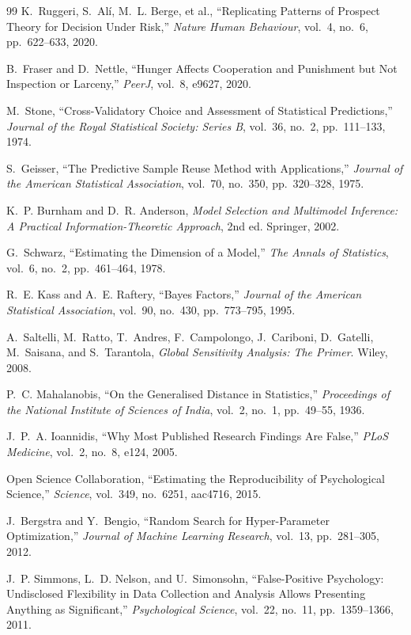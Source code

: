 \documentclass[12pt]{article}
\begin{document}
\begin{thebibliography}{99}
K.~Ruggeri, S.~Al\'{i}, M.~L. Berge, et al., ``Replicating Patterns of Prospect Theory for Decision Under Risk,'' \emph{Nature Human Behaviour}, vol.~4, no.~6, pp.~622--633, 2020.

B.~Fraser and D.~Nettle, ``Hunger Affects Cooperation and Punishment but Not Inspection or Larceny,'' \emph{PeerJ}, vol.~8, e9627, 2020.

M.~Stone, ``Cross-Validatory Choice and Assessment of Statistical Predictions,'' \emph{Journal of the Royal Statistical Society: Series B}, vol.~36, no.~2, pp.~111--133, 1974.

S.~Geisser, ``The Predictive Sample Reuse Method with Applications,'' \emph{Journal of the American Statistical Association}, vol.~70, no.~350, pp.~320--328, 1975.

K.~P. Burnham and D.~R. Anderson, \emph{Model Selection and Multimodel Inference: A Practical Information-Theoretic Approach}, 2nd ed. Springer, 2002.

G.~Schwarz, ``Estimating the Dimension of a Model,'' \emph{The Annals of Statistics}, vol.~6, no.~2, pp.~461--464, 1978.

R.~E. Kass and A.~E. Raftery, ``Bayes Factors,'' \emph{Journal of the American Statistical Association}, vol.~90, no.~430, pp.~773--795, 1995.

A.~Saltelli, M.~Ratto, T.~Andres, F.~Campolongo, J.~Cariboni, D.~Gatelli, M.~Saisana, and S.~Tarantola, \emph{Global Sensitivity Analysis: The Primer}. Wiley, 2008.

P.~C. Mahalanobis, ``On the Generalised Distance in Statistics,'' \emph{Proceedings of the National Institute of Sciences of India}, vol.~2, no.~1, pp.~49--55, 1936.

J.~P.~A. Ioannidis, ``Why Most Published Research Findings Are False,'' \emph{PLoS Medicine}, vol.~2, no.~8, e124, 2005.

Open Science Collaboration, ``Estimating the Reproducibility of Psychological Science,'' \emph{Science}, vol.~349, no.~6251, aac4716, 2015.

J.~Bergstra and Y.~Bengio, ``Random Search for Hyper-Parameter Optimization,'' \emph{Journal of Machine Learning Research}, vol.~13, pp.~281--305, 2012.

J.~P. Simmons, L.~D. Nelson, and U.~Simonsohn, ``False-Positive Psychology: Undisclosed Flexibility in Data Collection and Analysis Allows Presenting Anything as Significant,'' \emph{Psychological Science}, vol.~22, no.~11, pp.~1359--1366, 2011.


\end{thebibliography}
\end{document}
